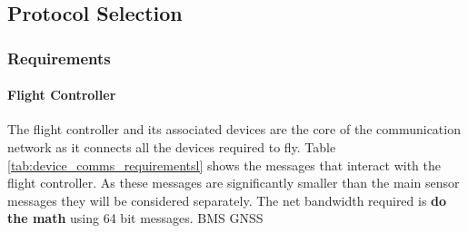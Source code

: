 \subsection{Protocol Selection}

\subsubsection{Requirements}
    \paragraph{Flight Controller}
    The flight controller and its associated devices are the core of the communication network as it connects all the devices required to fly. Table \ref{tab:device_comms_requirementsl} shows the messages that interact with the flight controller. As these messages are significantly smaller than the main sensor messages they will be considered separately. The net bandwidth required is \textbf{do the math} using 64 bit messages.
    \gls{BMS}
    \gls{GNSS}
